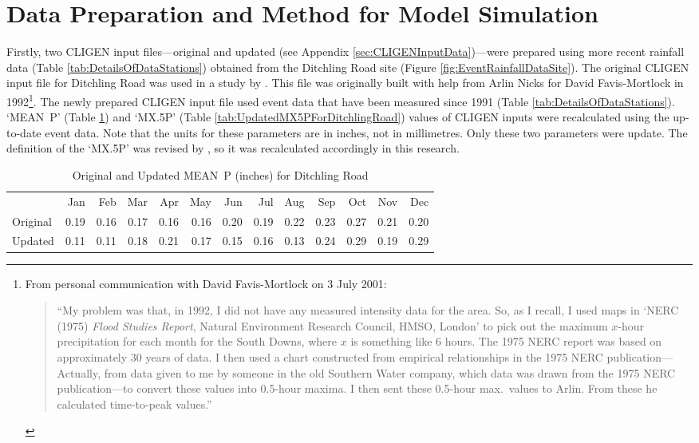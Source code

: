 \section{Data Preparation and Method for Model Simulation}
\label{sec:ImprovedCligenMethods}
Firstly, two CLIGEN input files---original and updated (see Appendix
\ref{sec:CLIGENInputData})---were prepared using more recent rainfall data
(Table \ref{tab:DetailsOfDataStations}) obtained from the Ditchling Road site
(Figure \ref{fig:EventRainfallDataSite}). The original CLIGEN input file for
Ditchling Road was used in a study by \citet{favis-mortlock1998-141}. This file
was originally built with help from Arlin Nicks for David Favis-Mortlock in
1992\footnote{From personal communication with David Favis-Mortlock on 3 July
2001: \begin{quotation} ``My problem was that, in 1992, I did not have any
measured intensity data for the area. So, as I recall, I used maps in `NERC
(1975) \textit{Flood Studies Report}, Natural Environment Research Council,
HMSO, London' to pick out the maximum $x$-hour precipitation for each month for
the South Downs, where $x$ is something like 6 hours. The 1975 NERC report was
based on approximately 30 years of data. I then used a chart constructed from
empirical relationships in the 1975 NERC publication---Actually, from data given
to me by someone in the old Southern Water company, which data was drawn from
the 1975 NERC publication---to convert these values into 0.5-hour maxima. I then
sent these 0.5-hour max.\ values to Arlin. From these he calculated time-to-peak
values.'' \end{quotation}}. The newly prepared CLIGEN input file used event data
that have been measured since 1991 (Table \ref{tab:DetailsOfDataStations}).
`MEAN~P' (Table \ref{tab:UpdatedMEANPForDitchlingRoad}) and `{MX.5P}' (Table
\ref{tab:UpdatedMX5PForDitchlingRoad}) values of CLIGEN inputs were recalculated
using the up-to-date event data. Note that the units for these parameters are in
inches, not in millimetres. Only these two parameters were update. The
definition of the `{MX.5P}' was revised by \citet{yu2000-301}, so it was
recalculated accordingly in this research.

\begin{table}[htbp]
  \centering
  \caption[Original and Updated MEAN~P for Ditchling Road]{Original and
Updated MEAN~P (inches) for Ditchling Road}
  \label{tab:UpdatedMEANPForDitchlingRoad}
    \footnotesize
    \begin{tabular}{lrrrrrrrrrrrr}
    \toprule
     & Jan & Feb & Mar & Apr & May & Jun & Jul & Aug & Sep & Oct &
Nov & Dec\\
    \cmidrule{2-13}
    Original & 0.19 & 0.16 & 0.17 & 0.16 & 0.16 & 0.20 & 0.19 & 0.22
& 0.23 & 0.27 & 0.21 & 0.20\\
    Updated & 0.11 & 0.11 & 0.18 & 0.21 & 0.17 & 0.15 & 0.16 & 0.13
& 0.24 & 0.29 & 0.19 & 0.29\\
    \bottomrule
    \end{tabular}
\end{table}

